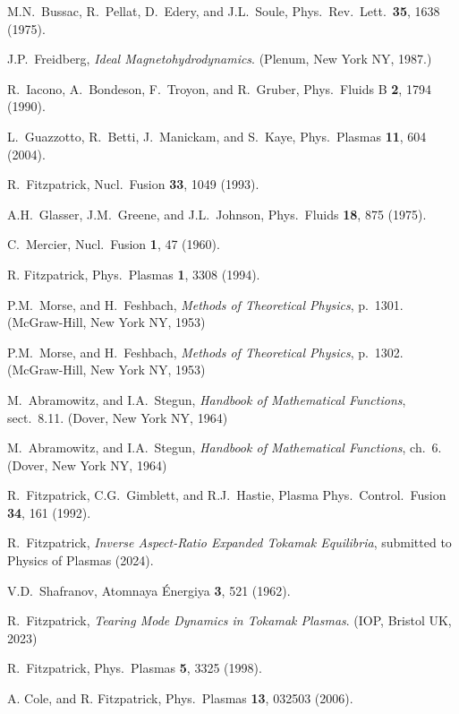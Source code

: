 \documentclass[12pt,prb,aps]{revtex4-1}
\begin{document}
\begin{thebibliography}{99}
 M.N.~Bussac, R.~Pellat, D.~Edery, and J.L.~Soule, Phys.\ Rev.\ Lett.\ {\bf 35}, 1638 (1975).

 J.P.~Freidberg, {\em Ideal Magnetohydrodynamics}. (Plenum, New York NY, 1987.)

 R.~Iacono, A.~Bondeson, F.~Troyon, and R.~Gruber, Phys.\ Fluids B {\bf 2}, 1794 (1990).

 L.~Guazzotto,  R.~Betti, J.~Manickam, and  S.~Kaye, Phys.\ Plasmas {\bf 11}, 604 (2004).

 R.~Fitzpatrick, Nucl.\ Fusion {\bf 33}, 1049 (1993).

 A.H.~Glasser, J.M.~Greene, and J.L.~Johnson, Phys.\ Fluids {\bf 18}, 875 (1975).

 C.~Mercier, Nucl.\ Fusion {\bf 1}, 47 (1960).

 R. Fitzpatrick, Phys.\ Plasmas {\bf 1}, 3308 (1994).

 P.M.~Morse, and H.~Feshbach, {\em Methods of Theoretical Physics}, p.~1301. (McGraw-Hill, New York NY, 1953)

 P.M.~Morse, and H.~Feshbach, {\em Methods of Theoretical Physics}, p.~1302. (McGraw-Hill, New York NY, 1953)

 M.~Abramowitz, and I.A.~Stegun, {\em Handbook of Mathematical Functions}, sect.~8.11. (Dover, New York NY, 1964)

 M.~Abramowitz, and I.A.~Stegun, {\em Handbook of Mathematical Functions}, ch.~6. (Dover, New York NY, 1964)

 R.~Fitzpatrick, C.G.~Gimblett, and R.J.~Hastie, Plasma Phys.\ Control.\ Fusion {\bf 34}, 161 (1992). 

 R.~Fitzpatrick, {\em Inverse Aspect-Ratio Expanded Tokamak Equilibria}, submitted to Physics of Plasmas (2024).

 V.D.~Shafranov, Atomnaya \'{E}nergiya {\bf 3}, 521  (1962).

 R.~Fitzpatrick, {\em Tearing Mode Dynamics in Tokamak Plasmas}. (IOP, Bristol UK,  2023)

 R.~Fitzpatrick, Phys.\ Plasmas {\bf 5}, 3325 (1998).

 A. Cole, and R. Fitzpatrick, Phys.\ Plasmas {\bf 13}, 032503 (2006).

\end{thebibliography}
\end{document}
